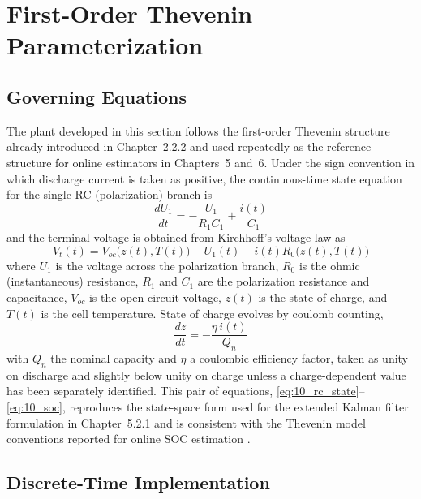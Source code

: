 \section{First-Order Thevenin Parameterization}
\label{sec:10_2}

\subsection{Governing Equations}

The plant developed in this section follows the first-order Thevenin
structure already introduced in Chapter~2.2.2 and used repeatedly as
the reference structure for online estimators in Chapters~5 and~6.
Under the sign convention in which discharge current is taken as
positive, the continuous-time state equation for the single RC
(polarization) branch is
\begin{equation}
\frac{dU_1}{dt} = -\frac{U_1}{R_1 C_1} + \frac{i(t)}{C_1}
\label{eq:10_rc_state}
\end{equation}
and the terminal voltage is obtained from Kirchhoff's voltage law as
\begin{equation}
V_t(t) = V_{oc}\big(z(t), T(t)\big) - U_1(t) - i(t) R_0\big(z(t), T(t)\big)
\label{eq:10_terminal}
\end{equation}
where $U_1$ is the voltage across the polarization branch, $R_0$ is
the ohmic (instantaneous) resistance, $R_1$ and $C_1$ are the
polarization resistance and capacitance, $V_{oc}$ is the open-circuit
voltage, $z(t)$ is the state of charge, and $T(t)$ is the cell
temperature. State of charge evolves by coulomb counting,
\begin{equation}
\frac{dz}{dt} = -\frac{\eta \, i(t)}{Q_n}
\label{eq:10_soc}
\end{equation}
with $Q_n$ the nominal capacity and $\eta$ a coulombic efficiency
factor, taken as unity on discharge and slightly below unity on charge
unless a charge-dependent value has been separately identified. This
pair of equations, \eqref{eq:10_rc_state}--\eqref{eq:10_soc},
reproduces the state-space form used for the extended Kalman filter
formulation in Chapter~5.2.1 and is consistent with the Thevenin
model conventions reported for online SOC estimation
\cite{arxiv_ekf_thevenin}.

\subsection{Discrete-Time Implementation}

